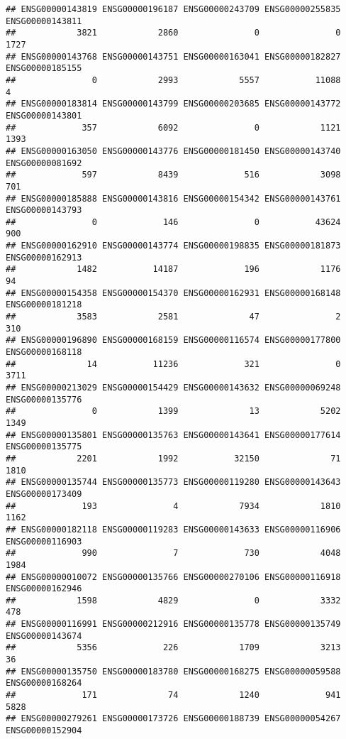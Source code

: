 \documentclass[
]{article}
\begin{document}
\begin{verbatim}
## ENSG00000143819 ENSG00000196187 ENSG00000243709 ENSG00000255835 ENSG00000143811 
##            3821            2860               0               0            1727 
## ENSG00000143768 ENSG00000143751 ENSG00000163041 ENSG00000182827 ENSG00000185155 
##               0            2993            5557           11088               4 
## ENSG00000183814 ENSG00000143799 ENSG00000203685 ENSG00000143772 ENSG00000143801 
##             357            6092               0            1121            1393 
## ENSG00000163050 ENSG00000143776 ENSG00000181450 ENSG00000143740 ENSG00000081692 
##             597            8439             516            3098             701 
## ENSG00000185888 ENSG00000143816 ENSG00000154342 ENSG00000143761 ENSG00000143793 
##               0             146               0           43624             900 
## ENSG00000162910 ENSG00000143774 ENSG00000198835 ENSG00000181873 ENSG00000162913 
##            1482           14187             196            1176              94 
## ENSG00000154358 ENSG00000154370 ENSG00000162931 ENSG00000168148 ENSG00000181218 
##            3583            2581              47               2             310 
## ENSG00000196890 ENSG00000168159 ENSG00000116574 ENSG00000177800 ENSG00000168118 
##              14           11236             321               0            3711 
## ENSG00000213029 ENSG00000154429 ENSG00000143632 ENSG00000069248 ENSG00000135776 
##               0            1399              13            5202            1349 
## ENSG00000135801 ENSG00000135763 ENSG00000143641 ENSG00000177614 ENSG00000135775 
##            2201            1992           32150              71            1810 
## ENSG00000135744 ENSG00000135773 ENSG00000119280 ENSG00000143643 ENSG00000173409 
##             193               4            7934            1810            1162 
## ENSG00000182118 ENSG00000119283 ENSG00000143633 ENSG00000116906 ENSG00000116903 
##             990               7             730            4048            1984 
## ENSG00000010072 ENSG00000135766 ENSG00000270106 ENSG00000116918 ENSG00000162946 
##            1598            4829               0            3332             478 
## ENSG00000116991 ENSG00000212916 ENSG00000135778 ENSG00000135749 ENSG00000143674 
##            5356             226            1709            3213              36 
## ENSG00000135750 ENSG00000183780 ENSG00000168275 ENSG00000059588 ENSG00000168264 
##             171              74            1240             941            5828 
## ENSG00000279261 ENSG00000173726 ENSG00000188739 ENSG00000054267 ENSG00000152904 

\end{verbatim}
\end{document}

